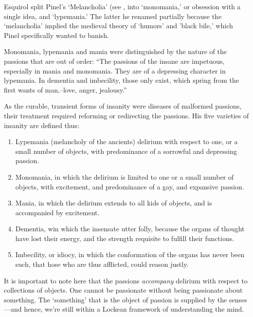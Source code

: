 \begin{refsection}
Esquirol split Pinel’s ‘Melancholia’ (see , into ‘monomania,’ or obsession with a single idea, and `lypemania.' The latter he renamed partially because the ‘melancholia’ implied the medieval theory of `humors' and 'black bile,’ which Pinel specifically wanted to banish. 

Monomania, lypemania and mania were distinguished by the nature of the passions that are out of order: “The passions of the insane are impetuous, especially in mania and monomania. They are of a depressing character in lypemania. In dementia and imbecility, those only exist, which spring from the first wants of man,--love, anger, jealousy.” ~\citep[p 26]{Esquirol:1845ug} 

As the curable, transient forms of insanity were diseases of malformed passions, their treatment required reforming or redirecting the passions. His five varieties of insanity are defined thus:

\begin{enumerate}
\item Lypemania (melancholy of the ancients) delirium with respect to one, or a small number of objects, with predominance of a sorrowful and depressing passion.

\item Monomania, in which the delirium is limited to one or a small number of objects, with excitement, and predominance of a gay, and expansive passion.

\item Mania, in which the delirium extends to all kids of objects, and is accompanied by excitement.

\item Dementia, win which the insensate utter folly, because the organs of thought have lost their energy, and the strength requisite to fulfill their functions.

\item Imbecility, or idiocy, in which the conformation of the organs has never been such, that hose who are thus afflicted, could reason justly. ~\citep[p. 29]{Esquirol:1845ug}

\end{enumerate}

It is important to note here that the passions \emph{accompany} delirium with respect to collections of objects. One cannot be passionate without being passionate about something. The `something' that is the object of passion is supplied by the senses---and hence, we're still within a Lockean framework of understanding the mind. 


\end{refsection}
